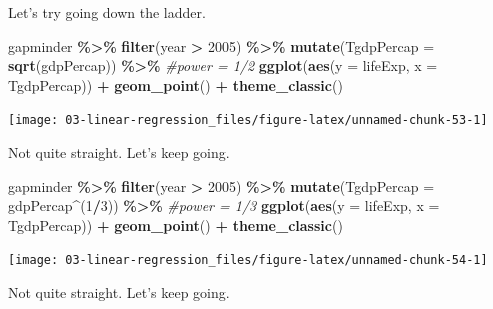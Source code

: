 \documentclass[
]{book}
\newenvironment{Shaded}{\begin{snugshade}}{\end{snugshade}}
\newcommand{\AttributeTok}[1]{\textcolor[rgb]{0.13,0.29,0.53}{#1}}
\newcommand{\CommentTok}[1]{\textcolor[rgb]{0.56,0.35,0.01}{\textit{#1}}}
\newcommand{\DecValTok}[1]{\textcolor[rgb]{0.00,0.00,0.81}{#1}}
\newcommand{\FunctionTok}[1]{\textcolor[rgb]{0.13,0.29,0.53}{\textbf{#1}}}
\newcommand{\NormalTok}[1]{#1}
\newcommand{\SpecialCharTok}[1]{\textcolor[rgb]{0.81,0.36,0.00}{\textbf{#1}}}
\begin{document}
Let's try going down the ladder.

\begin{Shaded}
\begin{Highlighting}[]
\NormalTok{gapminder }\SpecialCharTok{\%\textgreater{}\%} 
  \FunctionTok{filter}\NormalTok{(year }\SpecialCharTok{\textgreater{}} \DecValTok{2005}\NormalTok{) }\SpecialCharTok{\%\textgreater{}\%}
  \FunctionTok{mutate}\NormalTok{(}\AttributeTok{TgdpPercap =} \FunctionTok{sqrt}\NormalTok{(gdpPercap)) }\SpecialCharTok{\%\textgreater{}\%} \CommentTok{\#power = 1/2}
  \FunctionTok{ggplot}\NormalTok{(}\FunctionTok{aes}\NormalTok{(}\AttributeTok{y =}\NormalTok{ lifeExp, }\AttributeTok{x =}\NormalTok{  TgdpPercap)) }\SpecialCharTok{+} 
  \FunctionTok{geom\_point}\NormalTok{() }\SpecialCharTok{+} 
  \FunctionTok{theme\_classic}\NormalTok{()}
\end{Highlighting}
\end{Shaded}

\begin{center}\texttt{[image: 03-linear-regression\_files/figure-latex/unnamed-chunk-53-1]} \end{center}

Not quite straight. Let's keep going.

\begin{Shaded}
\begin{Highlighting}[]
\NormalTok{gapminder }\SpecialCharTok{\%\textgreater{}\%} 
  \FunctionTok{filter}\NormalTok{(year }\SpecialCharTok{\textgreater{}} \DecValTok{2005}\NormalTok{) }\SpecialCharTok{\%\textgreater{}\%}
  \FunctionTok{mutate}\NormalTok{(}\AttributeTok{TgdpPercap =}\NormalTok{ gdpPercap}\SpecialCharTok{\^{}}\NormalTok{(}\DecValTok{1}\SpecialCharTok{/}\DecValTok{3}\NormalTok{)) }\SpecialCharTok{\%\textgreater{}\%} \CommentTok{\#power = 1/3}
  \FunctionTok{ggplot}\NormalTok{(}\FunctionTok{aes}\NormalTok{(}\AttributeTok{y =}\NormalTok{ lifeExp, }\AttributeTok{x =}\NormalTok{  TgdpPercap)) }\SpecialCharTok{+} 
  \FunctionTok{geom\_point}\NormalTok{() }\SpecialCharTok{+} 
  \FunctionTok{theme\_classic}\NormalTok{()}
\end{Highlighting}
\end{Shaded}

\begin{center}\texttt{[image: 03-linear-regression\_files/figure-latex/unnamed-chunk-54-1]} \end{center}

Not quite straight. Let's keep going.
\end{document}

